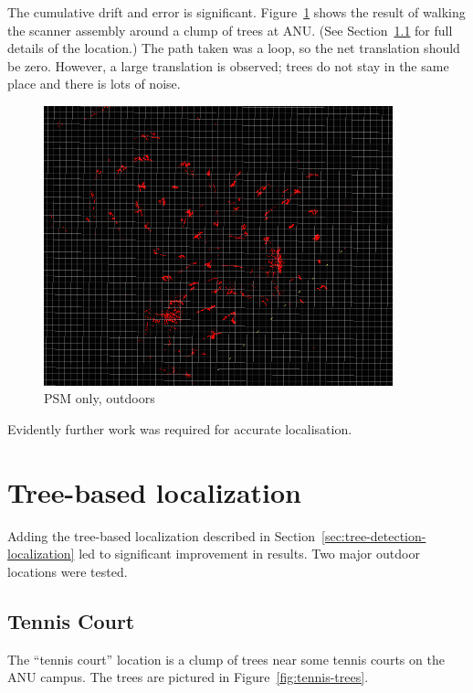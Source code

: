 \documentclass[12pt,oneside,a4paper,draft]{book}
\begin{document}
The cumulative drift and error is
significant. Figure~\ref{fig:psm-outdoor} shows the result of walking
the scanner assembly around a clump of trees at ANU. (See
Section~\ref{sec:tennis-court} for full details of the location.) The
path taken was a loop, so the net translation should be zero. However, a
large translation is observed; trees do not stay in the same place and
there is lots of noise.

\begin{figure}
  \centering
  \includegraphics[width=0.9\textwidth]{figs/psm-outdoor}
  \caption{PSM only, outdoors}
  \label{fig:psm-outdoor}
\end{figure}

Evidently further work was required for accurate localisation.
\newpage~\newpage
\section{Tree-based localization}
\label{sec:tree-based-local}

Adding the tree-based localization described in
Section~\ref{sec:tree-detection-localization} led to significant
improvement in results. Two major outdoor locations were tested.

\subsection{Tennis Court}
\label{sec:tennis-court}

The ``tennis court'' location is a clump of trees near some tennis
courts on the ANU campus. The trees are pictured in
Figure~\ref{fig:tennis-trees}.
\end{document}
